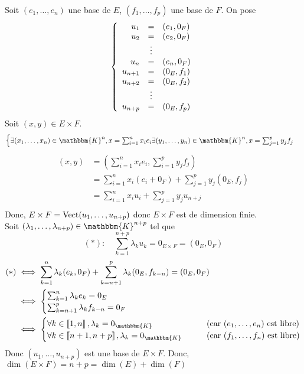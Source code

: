 \begin{prv}
	Soit $(e_1,\ldots, e_n)$ une base de $E$, $(f_1, \ldots, f_p)$ une base de $F$.
	On pose \[
		\left\{\begin{array}
			{r c l}
			u_1 &=& (e_1,0_F)\\
			u_2 &=& (e_2,0_F)\\
					&\vdots&\\
			u_n &=& (e_n,0_F)\\
			u_{n+1} &=& (0_E, f_1)\\
			u_{n+2} &=& (0_E, f_2)\\
					&\vdots&\\
			u_{n+p} &=& (0_E,f_p)\\
		\end{array}\right.
	\]
	Soit $(x,y) \in E\times F$. \[
		\begin{cases}
			\exists (x_1,\ldots,x_n)\in \mathbbm{K}^n, x = \sum_{i=1}^{n} x_ie_i
			\exists (y_1,\ldots,y_n)\in \mathbbm{K}^n, x = \sum_{j=1}^{p} y_jf_j
		\end{cases}
	\] 
	\begin{align*}
		(x,y) &= \left( \sum_{i=1}^{n} x_ie_i, \sum_{i=1}^{p} y_jf_j \right)  \\
		&= \sum_{i=1}^{n} x_i (e_i + 0_F) + \sum_{j=1}^{p} y_j (0_E, f_j) \\
		&= \sum_{i=1}^{n} x_i u_i + \sum_{j=1}^{p} y_j u_{n+j} \\
	\end{align*}
	Donc, $E\times F = \operatorname{Vect}(u_1, \ldots, u_{n+p})$ donc $E\times F$ est de dimension finie.\\
	Soit $(\lambda_1, \ldots, \lambda_{n+p}) \in \mathbbm{K}^{n+p}$ tel que \[
		(*): \quad \sum_{k=1}^{n+p} \lambda_ku_k = 0_{E\times F} = (0_E, 0_F)
	\]
	\begin{align*}
		(*) &\iff \sum_{k=1}^{n} \lambda_k (e_k, 0_F) + \sum_{k=n+1}^{p} \lambda_k(0_E, f_{k-n}) = (0_E, 0_F)\\
				&\iff \begin{cases}
					\sum_{k=1}^{n} \lambda_k e_k = 0_E\\
					\sum_{k=n+1}^{p} \lambda_k f_{k-n} = 0_F
				\end{cases}\\
				&\iff \begin{cases}
					\forall k \in \left\llbracket 1,n \right\rrbracket, \lambda_k = 0_\mathbbm{K} \qquad&(\text{car $(e_1,\ldots,e_n)$ est libre})\\
					\forall k \in \left\llbracket n+1,n+p \right\rrbracket, \lambda_k = 0_\mathbbm{K} \qquad&(\text{car $(f_1,\ldots,f_n)$ est libre})\\
				\end{cases}
	\end{align*}
	Donc $(u_1, \ldots, u_{n+p})$ est une base de $E\times F$. Donc, $\dim(E\times F) = n + p = \dim(E) + \dim(F)$
\end{prv}

